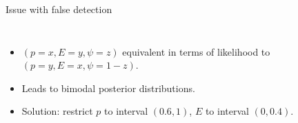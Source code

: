 \documentclass{beamer}
\begin{document}
\begin{frame}{Issue with false detection}
	\begin{columns}
		\column{5cm}
		\begin{itemize}
			\item $(p=x, E=y, \psi=z)$ equivalent in terms of likelihood to
			$(p=y,E=x,\psi=1-z)$.
			\item Leads to bimodal posterior distributions.
			\item Solution: restrict $p$ to interval $(0.6,1)$, $E$ to interval
			$(0,0.4)$.
		\end{itemize}
		\column{5cm}
	\end{columns}
\end{frame}

\end{document}
